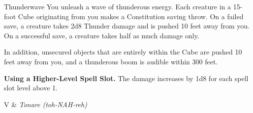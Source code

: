 \begin{Spell}[
    level=1st,
    time=1 Action,
    range=Self (15 ft.),
    components={V, S},
    duration=Instantaneous,
    school=Evocation,
    attack=CON Save,
    effect=Thunder
]{Thunderwave}
You unleash a wave of thunderous energy. Each creature in a 15-foot Cube originating from you makes a Constitution saving throw. On a failed save, a creature takes 2d8 Thunder damage and is pushed 10 feet away from you. On a successful save, a creature takes half as much damage only.

In addition, unsecured objects that are entirely within the Cube are pushed 10 feet away from you, and a thunderous boom is audible within 300 feet.

\textbf{Using a Higher-Level Spell Slot.} The damage increases by 1d8 for each spell slot level above 1.

\begin{components}
V & \textit{Tonare (toh-NAH-reh)}
\end{components}
\end{Spell}


